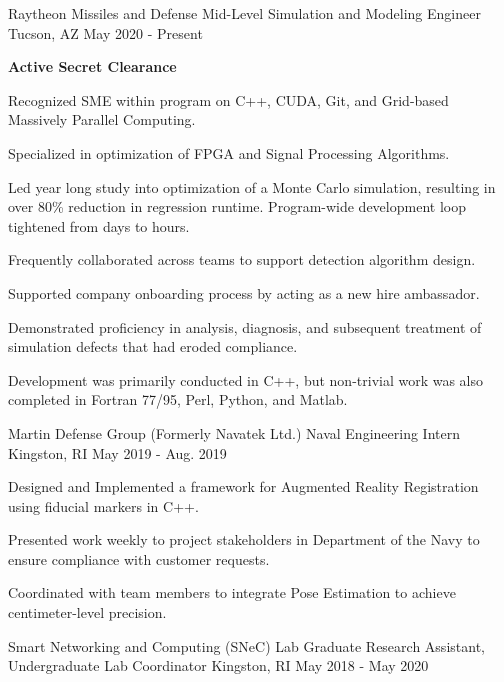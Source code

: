 \begin{cventries}
   \cventry
     {Raytheon Missiles and Defense}
     {Mid-Level Simulation and Modeling Engineer}
     {Tucson, AZ}
     {May 2020 - Present}
     {
       \begin{cvitems}
       \item{\textbf{Active Secret Clearance}}
        \item{Recognized SME within program on C++, CUDA, Git, and Grid-based Massively Parallel Computing.}
        \item{Specialized in optimization of FPGA and Signal Processing Algorithms.}
        \item{Led year long study into optimization of a Monte Carlo simulation, resulting in over 80\% reduction in regression runtime. Program-wide development loop tightened from days to hours.}
        \item{Frequently collaborated across teams to support detection algorithm design.}
        \item{Supported company onboarding process by acting as a new hire ambassador.}
        \item{Demonstrated proficiency in analysis, diagnosis, and subsequent treatment of simulation defects that had eroded compliance.}
        \item{Development was primarily conducted in C++, but non-trivial work was also completed in Fortran 77/95, Perl, Python, and Matlab.}
       \end{cvitems}
     }
   \cventry
     {Martin Defense Group (Formerly Navatek Ltd.)}
     {Naval Engineering Intern}
     {Kingston, RI}
     {May 2019 - Aug. 2019}
     {
       \begin{cvitems}
        \item{Designed and Implemented a framework for Augmented Reality Registration using fiducial markers in C++.}
        \item{Presented work weekly to project stakeholders in Department of the Navy to ensure compliance with customer requests.}
        \item{Coordinated with team members to integrate Pose Estimation to achieve centimeter-level precision.}
       \end{cvitems}
     }
  \cventry
    {Smart Networking and Computing (SNeC) Lab}
    {Graduate Research Assistant, Undergraduate Lab Coordinator}
    {Kingston, RI}
    {May 2018 - May 2020}
    {
      \begin{cvitems} 

\end{cvitems}}
\end{cventries}

